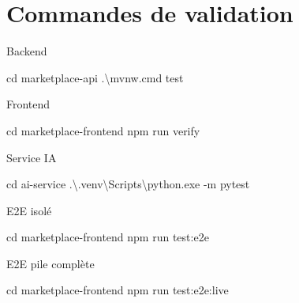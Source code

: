\chapter{Commandes de validation}

Backend


cd marketplace-api
.\textbackslash{}mvnw.cmd test


Frontend


cd marketplace-frontend
npm run verify


Service IA


cd ai-service
.\textbackslash{}.venv\textbackslash{}Scripts\textbackslash{}python.exe -m pytest


E2E isolé


cd marketplace-frontend
npm run test:e2e


E2E pile complète


cd marketplace-frontend
npm run test:e2e:live
